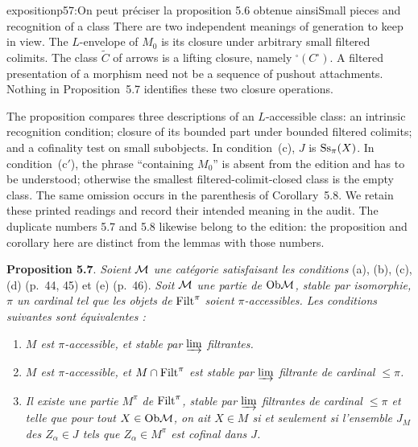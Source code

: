 \begin{dcomment}{exposition}{p57:On peut préciser la proposition 5.6 obtenue ainsi}{Small pieces and recognition of a class}
There are two independent meanings of generation to keep in view. The $L$-envelope of $M_0$ is its closure under arbitrary small filtered colimits. The class $\widetilde C$ of arrows is a lifting closure, namely ${}^{\square}(C^{\square})$. A filtered presentation of a morphism need not be a sequence of pushout attachments. Nothing in Proposition~5.7 identifies these two closure operations.

The proposition compares three descriptions of an $L$-accessible class: an intrinsic recognition condition; closure of its bounded part under bounded filtered colimits; and a cofinality test on small subobjects. In condition~(c), $J$ is $\mathrm{Ss}_\pi(X)$. In condition~(c$'$), the phrase ``containing $M_0$'' is absent from the edition and has to be understood; otherwise the smallest filtered-colimit-closed class is the empty class. The same omission occurs in the parenthesis of Corollary~5.8. We retain these printed readings and record their intended meaning in the audit. The duplicate numbers 5.7 and 5.8 likewise belong to the edition: the proposition and corollary here are distinct from the lemmas with those numbers.
\end{dcomment}


\textbf{Proposition 5.7}. \textit{Soient $\mathcal{M}$ une catégorie satisfaisant les conditions} (a), (b), (c), (d) (p.~44, 45) et (e) (p.~46). \textit{Soit $\mathcal{M}$ une partie de} $\mathrm{Ob}\mathcal{M}$\textit{, stable par isomorphie, $\pi$ un cardinal tel que les objets de} $\mathrm{Filt}^\pi$ \textit{soient $\pi$-accessibles. Les conditions suivantes sont équivalentes :} %

\begin{enumerate}[label={}]
\item[a)] \textit{$M$ est $\pi$-accessible, et stable par $\varinjlim$ filtrantes.}
\item[b)] \textit{$M$ est $\pi$-accessible, et $M \cap \mathrm{Filt}^\pi$ est stable par $\varinjlim$ filtrante de cardinal $\leq \pi$.}
\item[c)] \textit{Il existe une partie $M^\pi$ de} $\mathrm{Filt}^\pi$\textit{, stable par $\varinjlim$ filtrantes de cardinal $\leq \pi$ et telle que pour tout $X \in \mathrm{Ob}\mathcal{M}$, on ait $X \in M$ si et seulement si l'ensemble $J_M$ des $Z_\alpha \in J$ tels que $Z_\alpha \in M^\pi$ est cofinal dans $J$.}
\end{enumerate}

